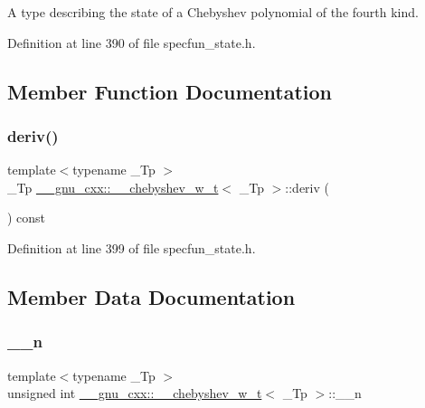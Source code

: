 A type describing the state of a Chebyshev polynomial of the fourth kind. 

Definition at line 390 of file specfun\+\_\+state.\+h.



\subsection{Member Function Documentation}
\mbox{\label{struct____gnu__cxx_1_1____chebyshev__w__t_a12989ea093bebe65f3d35dbfe3a6dc92}} 
\subsubsection{\texorpdfstring{deriv()}{deriv()}}
{\footnotesize\ttfamily template$<$typename \+\_\+\+Tp $>$ \\
\+\_\+\+Tp \hyperlink{struct____gnu__cxx_1_1____chebyshev__w__t}{\+\_\+\+\_\+gnu\+\_\+cxx\+::\+\_\+\+\_\+chebyshev\+\_\+w\+\_\+t}$<$ \+\_\+\+Tp $>$\+::deriv (\begin{DoxyParamCaption}{ }\end{DoxyParamCaption}) const\hspace{0.3cm}{\ttfamily [inline]}}



Definition at line 399 of file specfun\+\_\+state.\+h.



\subsection{Member Data Documentation}
\mbox{\label{struct____gnu__cxx_1_1____chebyshev__w__t_a32cb7428d8402e9a3846fd41b0f16ca2}} 
\subsubsection{\texorpdfstring{\+\_\+\+\_\+n}{\_\_n}}
{\footnotesize\ttfamily template$<$typename \+\_\+\+Tp $>$ \\
unsigned int \hyperlink{struct____gnu__cxx_1_1____chebyshev__w__t}{\+\_\+\+\_\+gnu\+\_\+cxx\+::\+\_\+\+\_\+chebyshev\+\_\+w\+\_\+t}$<$ \+\_\+\+Tp $>$\+::\+\_\+\+\_\+n}



